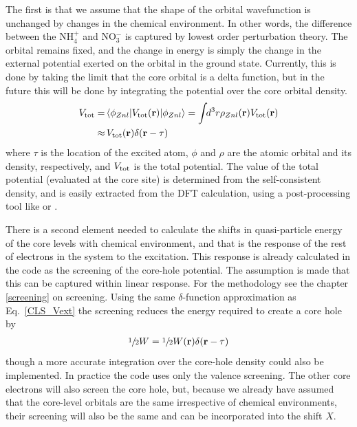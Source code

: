 \documentclass[11pt]{report}
\begin{document}
The first is that we assume that the shape of the orbital wavefunction is unchanged by changes in the chemical environment. In other words, the difference between the NH$_4^+$ and NO$_3^-$ is captured by lowest order perturbation theory. 
The orbital remains fixed, and the change in energy is simply the change in the external potential exerted on the orbital in the ground state. 
Currently, this is done by taking the limit that the core orbital is a delta function, but in the future this will be done by integrating the potential over the core orbital density. 
\begin{align}
V_{\rm{tot}} =& \, \langle \phi_{Znl} \vert V_{\rm{tot}}(\mathbf{r}) \vert \phi_{Znl} \rangle = \int \!\! d^3r \rho_{Znl}(\mathbf{r})  V_{\rm{tot}}(\mathbf{r}) \nonumber \\
\approx&  \, V_{\rm{tot}}(\mathbf{r})  \delta(\mathbf{r} - \mathbf{\tau}) 
\label{CLS_Vext}
\end{align}
where $\tau$ is the location of the excited atom, $\phi$ and $\rho$ are the atomic orbital and its density, respectively, and $V_{\rm{tot}}$ is the total potential. 
The value of the total potential (evaluated at the core site) is determined from the self-consistent density, and is easily extracted from the DFT calculation, using a post-processing tool like  or .

There is a second element needed to calculate the shifts in quasi-particle energy of the core levels with chemical environment, and that is the response of the rest of electrons in the system to the excitation. 
This response is already calculated in the code as the screening of the core-hole potential.
The assumption is made that this can be captured within linear response. For the methodology see the chapter \ref{screening} on screening.
Using the same $\delta$-function approximation as Eq.~\ref{CLS_Vext} the screening reduces the energy required to create a core hole by
\begin{align}
\sfrac{1}{2} W = \sfrac{1}{2} W(\mathbf{r}) \delta(\mathbf{r} - \mathbf{\tau}) 
\end{align}
though a more accurate integration over the core-hole density could also be implemented. 
In practice the code uses only the valence screening. The other core electrons will also screen the core hole, but, because we already have assumed that the core-level orbitals are the same irrespective of chemical environments, their screening will also be the same and can be incorporated into the shift $X$.
\end{document}

